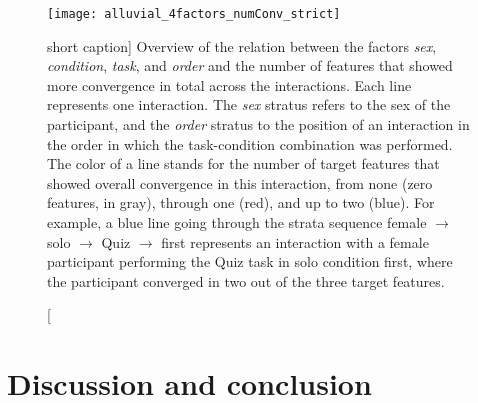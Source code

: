 \begin{figure}[t]
	\centering
	\texttt{[image: alluvial\_4factors\_numConv\_strict]}
	\caption
		[short caption]
		{Overview of the relation between the factors \emph{sex}, \emph{condition}, \emph{task}, and \emph{order} and the number of features that showed more convergence in total across the interactions.
		Each line represents one interaction.
		The \emph{sex} stratus refers to the sex of the participant, and the \emph{order} stratus to the position of an interaction in the order in which the task-condition combination was performed.
		The color of a line stands for the number of target features that showed overall convergence in this interaction, from none (zero features, in gray), through one (red), and up to two (blue).
		For example, a blue line going through the strata sequence female $\rightarrow$ solo $\rightarrow$ Quiz $\rightarrow$ first represents an interaction with a female participant performing the Quiz task in solo condition first, where the participant converged in two out of the three target features.}
	\label{fig:alluvial}
\end{figure}

\section{Discussion and conclusion}
\label{sec:discussion_and_conclusion}

